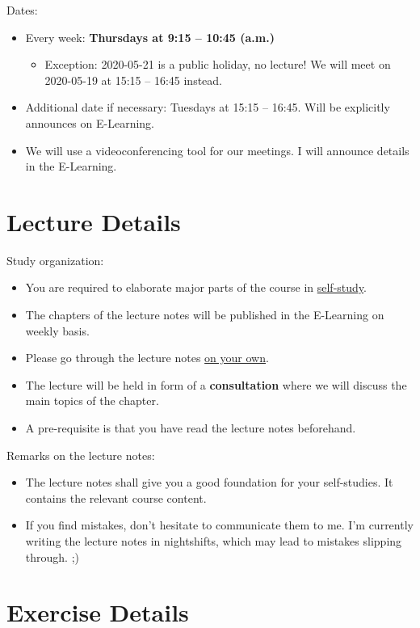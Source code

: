 Dates:
\begin{itemize}
	\item Every week: \textbf{Thursdays at 9:15 -- 10:45 (a.m.)}
	\begin{itemize}
		\item Exception: 2020-05-21 is a public holiday, no lecture! We will meet on 2020-05-19 at 15:15 -- 16:45 instead.
	\end{itemize}
	\item Additional date if necessary: Tuesdays at 15:15 -- 16:45. Will be explicitly announces on E-Learning.
	\item We will use a videoconferencing tool for our meetings. I will announce details in the E-Learning.
\end{itemize}


\section{Lecture Details}

Study organization:
\begin{itemize}
	\item You are required to elaborate major parts of the course in \underline{self-study}.
	\item The chapters of the lecture notes will be published in the E-Learning on weekly basis.
	\item Please go through the lecture notes \underline{on your own}.
	\item The lecture will be held in form of a \textbf{consultation} where we will discuss the main topics of the chapter.
	\item A pre-requisite is that you have read the lecture notes beforehand.
\end{itemize}

Remarks on the lecture notes:
\begin{itemize}
	\item The lecture notes shall give you a good foundation for your self-studies. It contains the relevant course content.
	\item If you find mistakes, don't hesitate to communicate them to me. I'm currently writing the lecture notes in nightshifts, which may lead to mistakes slipping through. ;)
\end{itemize}


\section{Exercise Details}

